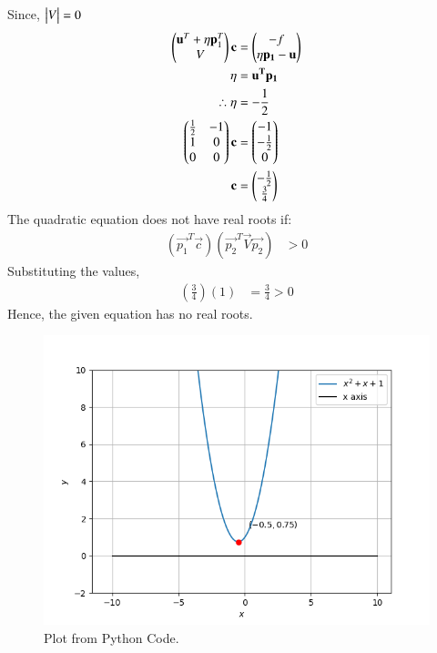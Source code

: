 \documentclass[journal,12pt,twocolumn]{IEEEtran}
\begin{document}
Since, $\begin{vmatrix}V\end{vmatrix} = 0$
\begin{align}
    \begin{pmatrix}\mathbf{u}^T + \eta\mathbf{p}^T_1\\V\end{pmatrix}\mathbf{c} &= \begin{pmatrix}-f \\ \eta\mathbf{p_1} - \mathbf{u}\end{pmatrix}\\
    \eta &= \mathbf{u^T}\mathbf{p_1}\\
    \therefore \eta &= -\frac{1}{2}\\
    \begin{pmatrix}\frac{1}{2} & -1\\1 & 0\\0 & 0\end{pmatrix}\mathbf{c} &= \begin{pmatrix}-1 \\ -\frac{1}{2} \\ 0\end{pmatrix} \\
    \mathbf{c} &= \begin{pmatrix}-\frac{1}{2}\\\frac{3}{4}\end{pmatrix}
\end{align}
The quadratic equation does not have real roots if:
\begin{align}
    (\vec{p_1}^T\vec{c})(\vec{p_2}^T\vec{V}\vec{p_2}) &> 0
\end{align}
Substituting the values,
\begin{align}
    \left(\frac{3}{4}\right)(1) &= \frac{3}{4} > 0
\end{align}
Hence, the given equation has no real roots.
\begin{figure}[h]
    \centering
    \includegraphics[scale = 0.5]{Figure_1.png}
    \caption{Plot from Python Code.}
    \label{fig:my_label}
\end{figure}
\end{document}
